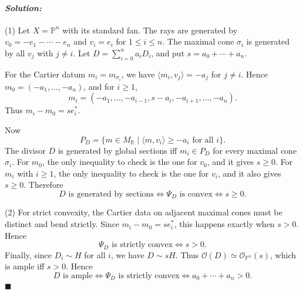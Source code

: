 \documentclass[12pt, a4paper]{article}
\newenvironment{solution}
  {\paragraph{\textit{Solution:}}\par\medskip}
  {\hfill$\blacksquare$\vspace{0.1cm}}
\begin{document}
\begin{solution}
(1) Let \(X=\mathbb P^n\) with its standard fan. The rays are generated by
\(v_0=-e_1-\cdots-e_n\) and \(v_i=e_i\) for \(1\le i\le n\). The maximal cone
\(\sigma_i\) is generated by all \(v_j\) with \(j\neq i\). Let
\(D=\sum_{i=0}^n a_iD_i\), and put \(s=a_0+\cdots+a_n\).

For the Cartier datum \(m_i=m_{\sigma_i}\), we have
\(\langle m_i,v_j\rangle=-a_j\) for \(j\neq i\). Hence
\(m_0=(-a_1,\dots,-a_n)\), and for \(i\ge1\),
\[
m_i=(-a_1,\dots,-a_{i-1},s-a_i,-a_{i+1},\dots,-a_n).
\]
Thus \(m_i-m_0=s e_i^*\).

Now
\[
P_D=\{m\in M_{\mathbb R}\mid \langle m,v_i\rangle\ge -a_i
\text{ for all }i\}.
\]
The divisor \(D\) is generated by global sections iff \(m_i\in P_D\) for every
maximal cone \(\sigma_i\). For \(m_0\), the only inequality to check is the one
for \(v_0\), and it gives \(s\ge0\). For \(m_i\) with \(i\ge1\), the only
inequality to check is the one for \(v_i\), and it also gives \(s\ge0\).
Therefore
\[
D\text{ is generated by sections}
\Longleftrightarrow \Psi_D\text{ is convex}
\Longleftrightarrow s\ge0.
\]

(2) For strict convexity, the Cartier data on adjacent maximal cones must be
distinct and bend strictly. Since \(m_i-m_0=s e_i^*\), this happens exactly when
\(s>0\). Hence
\[
\Psi_D\text{ is strictly convex}\Longleftrightarrow s>0.
\]
Finally, since \(D_i\sim H\) for all \(i\), we have \(D\sim sH\). Thus
\(\mathcal O(D)\simeq \mathcal O_{\mathbb P^n}(s)\), which is ample iff
\(s>0\). Hence
\[
D\text{ is ample}
\Longleftrightarrow \Psi_D\text{ is strictly convex}
\Longleftrightarrow a_0+\cdots+a_n>0.
\]
\end{solution}
\end{document}
